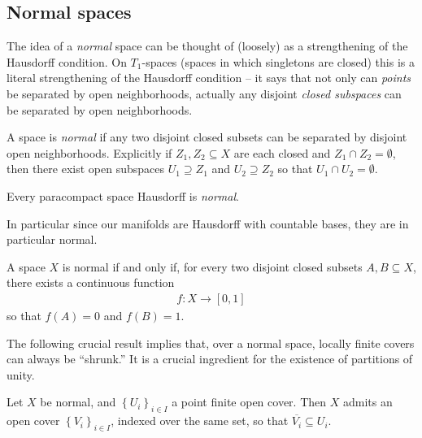 \documentclass[11pt]{book}
\begin{document}
\subsection{Normal spaces}

The idea of a \emph{normal} space can be thought of (loosely) as a strengthening of the Hausdorff condition. On $T_1$-spaces (spaces in which singletons are closed) this is a literal strengthening of the Hausdorff condition -- it says that not only can \emph{points} be separated by open neighborhoods, actually any disjoint \emph{closed subspaces} can be separated by open neighborhoods.

\begin{definition}\label{def:normal}
A space is \emph{normal} if any two disjoint closed subsets can be separated by disjoint open neighborhoods. Explicitly if $Z_1,Z_2 \subseteq X$ are each closed and $Z_1 \cap Z_2 = \emptyset$, then there exist open subspaces $U_1 \supseteq Z_1$ and $U_2 \supseteq Z_2$ so that $U_1 \cap U_2 = \emptyset$.
\end{definition}

\begin{theorem} Every paracompact space Hausdorff is \emph{normal}.
\end{theorem}

In particular since our manifolds are Hausdorff with countable bases, they are in particular normal.

\begin{lemma}
\label{lem:urysohn} 
A space $X$ is normal if and only if, for every two disjoint closed subsets $A,B \subseteq X$, there exists a continuous function
\begin{align*}
    f \colon X \to [0,1]
\end{align*}
so that $f(A) =0$ and $f(B) =1$.
\end{lemma}

The following crucial result implies that, over a normal space, locally finite covers can always be ``shrunk.'' It is a crucial ingredient for the existence of partitions of unity.

\begin{theorem}
\label{thm:shrinking}
Let $X$ be normal, and $\left\{ U_i \right\}_{i\in I}$ a point finite open cover. Then $X$ admits an open cover $\left\{ V_i \right\}_{i\in I}$, indexed over the same set, so that $\overline{V_i} \subseteq U_i$.
\end{theorem}
\end{document}
